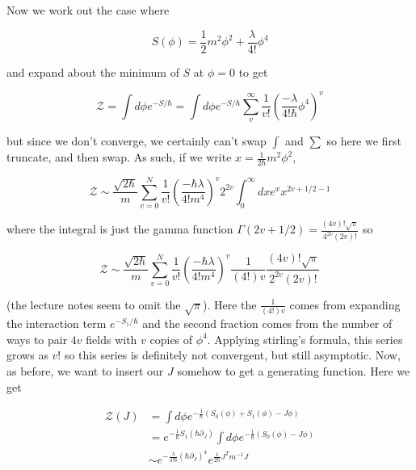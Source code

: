 \documentclass{article}
\theoremstyle{definition}
\begin{document}
Now we work out the case where

\begin{equation}
S(\phi) = \frac{1}{2} m^2 \phi^2 + \frac{\lambda}{4!} \phi^4
\end{equation}

and expand about the minimum of $S$ at $\phi=0$ to get

\begin{equation}
\mathcal{Z} = \int d\phi e^{-S / \hbar} = \int d\phi e^{-S / \hbar} 
\sum_v^\infty \frac{1}{v!} \left( \frac{-\lambda}{4! \hbar} \phi^4 \right)^v
\end{equation}

but since we don't converge, we certainly can't swap $\int$ and $\sum$ so here
we first truncate, and then swap. As such, if we write $x = \frac{1}{2\hbar} m^2
\phi^2$,

\begin{equation}
\mathcal{Z} \sim \frac{\sqrt{2\hbar}}{m} \sum_{v = 0}^N \frac{1}{v!} \left( 
\frac{-\hbar \lambda}{4! m^4} \right)^v 2^{2v} \int_0^\infty dx e^x x^{2v
+ 1/2 - 1}
\end{equation}

where the integral is just the gamma function $\Gamma(2v + 1/2) = \frac{(4v)!
  \sqrt{\pi}}{4^{2v} (2v)!}$ so

\begin{equation}
\mathcal{Z} \sim \frac{\sqrt{2\hbar}}{m} \sum_{v = 0}^N \frac{1}{v!} \left( 
\frac{-\hbar \lambda}{4! m^4} \right)^v \frac{1}{(4!) v} \frac{(4v)! \sqrt{\pi}}{2^{2v} (2v)!}
\end{equation}

(the lecture notes seem to omit the $\sqrt{\pi}$). Here the $\frac{1}{(4!) v}$
comes from expanding the interaction term $e^{-S_1 / \hbar}$ and the second
fraction comes from the number of ways to pair $4v$ fields with $v$ copies of
$\phi^4$. Applying stirling's formula, this series grows as $v!$ so this series
is definitely not convergent, but still asymptotic. Now, as before, we want to
insert our $J$ somehow to get a generating function. Here we get

\begin{align*}
\mathcal{Z}(J) &= \int d\phi e^{-\frac{1}{\hbar} (S_0(\phi) + S_1(\phi) - J\phi)} \\
&= e^{-\frac{1}{\hbar} S_1(\hbar \partial_J)} \int d\phi e^{-\frac{1}{\hbar} 
(S_0(\phi) - J\phi)} \\
&\sim e^{-\frac{\lambda}{4! \hbar} (\hbar \partial_J)^4} e^{\frac{1}{2\hbar} J^T m^{-1} J}
\end{align*}
\end{document}
